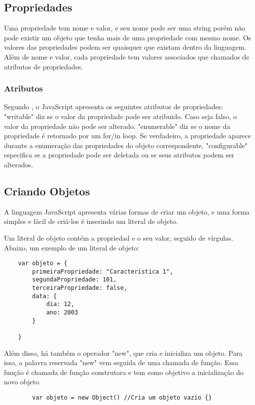 \subsection{Propriedades}
	Uma propriedade tem nome e valor, e seu nome pode ser uma string porém não pode existir um objeto que tenha mais de uma propriedade com mesmo nome. Os valores das propriedades podem ser quaisquer que existam dentro da linguagem. \newline
	Além de nome e valor, cada propriedade tem valores associados que chamados de atributos de propriedades. 
	
	\subsubsection{Atributos}
	Segundo \cite{flanagan2020javascript}, o JavaScript apresenta os seguintes atributos de propriedades:
	"writable" diz se o valor da propriedade pode ser atribuido. Caso seja falso, o valor da propriedade não pode ser alterado.
	"enumerable" diz se o nome da propriedade é retornado por um for/in loop. Se verdadeiro, a propriedade aparece durante a enumeração das propriedades do objeto correspondente. 
	"configurable" especifica se a propriedade pode ser deletada ou se seus atributos podem ser alterados.
\subsection{Criando Objetos}
	A linguagem JavaScript apresenta várias formas de criar um objeto, e uma forma simples e fácil de criá-los é inserindo um literal de objeto. 

	Um literal de objeto contém a propriedad e o seu valor, seguido de vírgulas. Abaixo, um exemplo de um literal de objeto: \newline 
   \begin{lstlisting}
    var objeto = {
    	primeiraPropriedade: "Caracteristica 1",
    	segundaPropriedade: 101,
    	terceiraPropriedade: false,
    	data: {
    		dia: 12,
    		ano: 2003
    	}
    
    }
    \end{lstlisting}

	Além disso, há também o operador "new", que cria e inicializa um objeto. Para isso, a palavra reservada "new" vem seguida de uma chamada de função. Essa função é chamada de função construtora e tem como objetivo a inicialização do novo objeto.
	
	\begin{lstlisting}
		var objeto = new Object() //Cria um objeto vazio {}
	\end{lstlisting}
	
